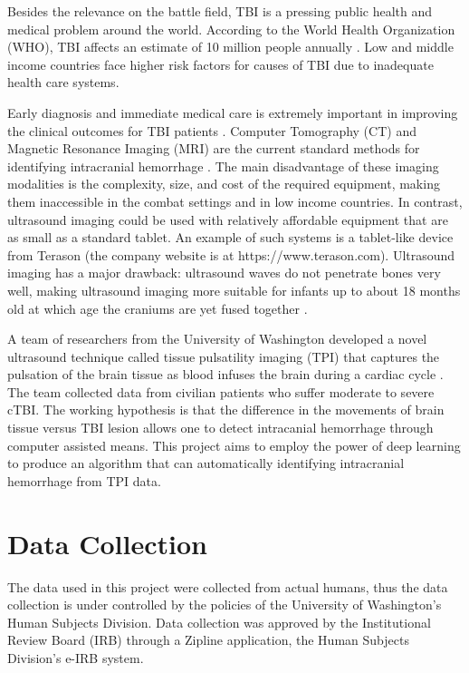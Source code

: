\documentclass [11pt, proquest] {uwthesis}[2020/02/24]
\begin{document}
Besides the relevance on the battle field, TBI is a pressing public health and medical problem
around the world. According to the World Health Organization (WHO), TBI affects an estimate of 10 million 
people annually \cite{hyder_impact_2007}. Low and middle income countries face higher risk factors
for causes of TBI due to inadequate health care systems.

Early diagnosis and immediate medical care is extremely important in improving the clinical outcomes for 
TBI patients \cite{management_2000}. Computer Tomography (CT) and Magnetic
Resonance Imaging (MRI) are the current standard methods for identifying  intracranial 
hemorrhage \cite{heit_imaging_2017}. The main disadvantage of these imaging modalities is the
complexity, size, and cost of the required equipment, making them inaccessible in the combat settings
and in low income countries. In contrast, ultrasound imaging could be used with relatively affordable
equipment that are as small as a standard tablet. An example of such systems is a tablet-like device 
from Terason (the company website is at https://www.terason.com). Ultrasound imaging has a major
drawback: ultrasound waves do not penetrate bones very well, making ultrasound imaging more suitable
for infants up to about 18 months old at which age the craniums are yet fused together \cite{cranial_ult}.

A team of researchers from the University of Washington  developed a novel ultrasound technique called
tissue pulsatility imaging (TPI) that captures the pulsation of the brain tissue as blood infuses the
brain during a cardiac cycle \cite{kucewicz_tissue_2008}. The team collected data from civilian patients who 
suffer moderate to severe cTBI. The working hypothesis is that the difference in the movements of brain tissue versus 
TBI lesion allows one to detect intracanial hemorrhage through computer assisted means. This project aims to employ the power
of deep learning to produce an algorithm that can automatically identifying intracranial hemorrhage from TPI data.

\section{Data Collection}
The data used in this project were collected from actual humans, thus the data collection is under controlled
by the policies of the University of Washington's Human Subjects Division. Data collection was approved by 
the Institutional Review Board (IRB) through a Zipline application, the Human Subjects Division's e-IRB system.
\end{document}
